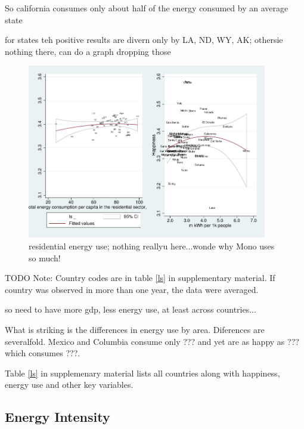 \documentclass[10pt, letterpaper]{article}
\begin{document}
\begin{spacing}{1.4}
So california consumes only about half of the energy consumed by an average
state %


for states teh positive results are divern only by LA, ND, WY, AK; othersie
nothing there, can do a graph dropping those



\begin{figure}[H]
 \includegraphics[height=3in]{graphsAndTables/lfELERESls.pdf}\centering
\caption{residential energy use; nothing reallyu here...wonde why Mono uses so much!}\label{}
\end{figure}
{\scriptsize TODO Note: Country codes are in table \ref{ls} in supplementary
  material. If country was observed in more than one year, the data were averaged.}

so need to have more gdp, less energy use, at least across countries...

What is striking is the differences in energy use by area. Diferences are
severalfold. Mexico and Columbia
consume only ??? and yet are as happy as ??? which consumes ???.
 
Table \ref{ls} in supplemenary material lists all countries along with
happiness, energy use and other key variables.

\subsection{Energy Intensity}


\end{spacing}
\end{document}

